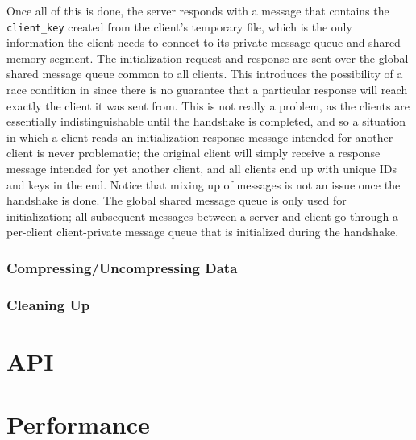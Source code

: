 \documentclass[paper=a4, fontsize=11pt]{scrartcl} %
\numberwithin{equation}{section} %
\numberwithin{figure}{section} %
\numberwithin{table}{section} %
\begin{document}
Once all of this is done, the server responds with a message that contains the \texttt{client\_key} created from the client's temporary file, which is the only information the client needs to connect to its private message queue and shared memory segment. The initialization request and response are sent over the global shared message queue common to all clients. This introduces the possibility of a race condition in since there is no guarantee that a particular response will reach exactly the client it was sent from. This is not really a problem, as the clients are essentially indistinguishable until the handshake is completed, and so a situation in which a client reads an initialization response message intended for another client is never problematic; the original client will simply receive a response message intended for yet another client, and all clients end up with unique IDs and keys in the end. Notice that mixing up of messages is not an issue once the handshake is done. The global shared message queue is only used for initialization; all subsequent messages between a server and client go through a per-client client-private message queue that is initialized during the handshake.


\subsubsection{Compressing/Uncompressing Data}

\subsubsection{Cleaning Up}


\section{API}
\section{Performance}
\end{document}
